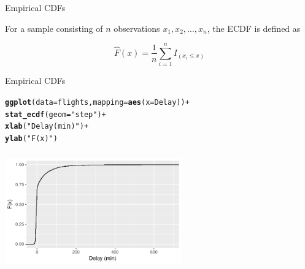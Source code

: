 \documentclass[10pt]{beamer}\usepackage[]{graphicx}\usepackage[]{color}
\makeatletter
\newcommand{\hlstr}[1]{\textcolor[rgb]{0.192,0.494,0.8}{#1}}%
\newcommand{\hlopt}[1]{\textcolor[rgb]{0,0,0}{#1}}%
\newcommand{\hlstd}[1]{\textcolor[rgb]{0.345,0.345,0.345}{#1}}%
\newcommand{\hlkwc}[1]{\textcolor[rgb]{0.333,0.667,0.333}{#1}}%
\newcommand{\hlkwd}[1]{\textcolor[rgb]{0.737,0.353,0.396}{\textbf{#1}}}%
\newenvironment{kframe}{%
 \def\at@end@of@kframe{}%
 \ifinner\ifhmode%
  \def\at@end@of@kframe{\end{minipage}}%
  \begin{minipage}{\columnwidth}%
 \fi\fi%
 \def\FrameCommand##1{\hskip\@totalleftmargin \hskip-\fboxsep
 \colorbox{shadecolor}{##1}\hskip-\fboxsep
     \hskip-\linewidth \hskip-\@totalleftmargin \hskip\columnwidth}%
 \MakeFramed {\advance\hsize-\width
   \@totalleftmargin\z@ \linewidth\hsize
   \@setminipage}}%
 {\par\unskip\endMakeFramed%
 \at@end@of@kframe}
\newenvironment{knitrout}{}{} %
\makeatother
\begin{document}
\begin{frame}[fragile]{Empirical CDFs}

For a sample consisting of $n$ observations $x_1, x_2, \ldots, x_n$, the ECDF is defined as

$$ \widehat{F} (x) = \dfrac{1}{n} \sum_{i=1}^n I_{(x_i \le x)} $$

\end{frame}

\begin{frame}[fragile]{Empirical CDFs}

\begin{knitrout}\small
{}\color{fgcolor}\begin{kframe}
\begin{alltt}
\hlkwd{ggplot}\hlstd{(}\hlkwc{data} \hlstd{= flights,} \hlkwc{mapping} \hlstd{=} \hlkwd{aes}\hlstd{(}\hlkwc{x} \hlstd{= Delay))} \hlopt{+}
  \hlkwd{stat_ecdf}\hlstd{(}\hlkwc{geom} \hlstd{=} \hlstr{"step"}\hlstd{)} \hlopt{+}
  \hlkwd{xlab}\hlstd{(}\hlstr{"Delay (min)"}\hlstd{)} \hlopt{+}
  \hlkwd{ylab}\hlstd{(}\hlstr{"F(x)"}\hlstd{)}
\end{alltt}
\end{kframe}
\includegraphics[width=3in,height=2in]{figure/unnamed-chunk-22-1} 

\end{knitrout}

\end{frame}
\end{document}
